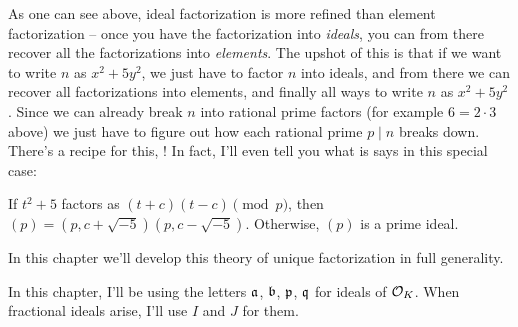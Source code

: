 As one can see above,
ideal factorization is more refined than element factorization -- once you have the factorization into \emph{ideals},
you can from there recover all the factorizations into \emph{elements}.
The upshot of this is that if we want to write $n$ as $x^2+5y^2$, we just have to factor $n$ into ideals,
and from there we can recover all factorizations into elements, and finally all ways to write $n$ as $x^2+5y^2$.
Since we can already break $n$ into rational prime factors (for example $6 = 2 \cdot 3$ above)
we just have to figure out how each rational prime $p \mid n$ breaks down.
There's a recipe for this, !
In fact, I'll even tell you what is says in this special case:
\begin{itemize}
	\ii If $t^2+5$ factors as $(t+c)(t-c) \pmod p$, then $(p) = (p, c+\sqrt{-5})(p, c-\sqrt{-5})$.
	\ii Otherwise, $(p)$ is a prime ideal.
\end{itemize}
In this chapter we'll develop this theory of unique factorization in full generality.


\begin{remark}
	In this chapter, I'll be using the letters $\aa$, $\bb$, $\pp$, $\qq$
	for ideals of $\OO_K$.
	When fractional ideals arise, I'll use $I$ and $J$ for them.
\end{remark}

